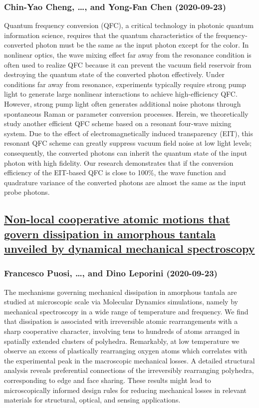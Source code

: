 \subsubsection*{Chin-Yao Cheng, \dots, and Yong-Fan Chen (2020-09-23)}
Quantum frequency conversion (QFC), a critical technology in photonic quantum
information science, requires that the quantum characteristics of the
frequency-converted photon must be the same as the input photon except for the
color. In nonlinear optics, the wave mixing effect far away from the resonance
condition is often used to realize QFC because it can prevent the vacuum field
reservoir from destroying the quantum state of the converted photon
effectively. Under conditions far away from resonance, experiments typically
require strong pump light to generate large nonlinear interactions to achieve
high-efficiency QFC. However, strong pump light often generates additional
noise photons through spontaneous Raman or parameter conversion processes.
Herein, we theoretically study another efficient QFC scheme based on a resonant
four-wave mixing system. Due to the effect of electromagnetically induced
transparency (EIT), this resonant QFC scheme can greatly suppress vacuum field
noise at low light levels; consequently, the converted photons can inherit the
quantum state of the input photon with high fidelity. Our research demonstrates
that if the conversion efficiency of the EIT-based QFC is close to 100\%, the
wave function and quadrature variance of the converted photons are almost the
same as the input probe photons.

\subsection*{\href{http://arxiv.org/abs/2009.11012v1}{Non-local cooperative atomic motions that govern dissipation in  amorphous tantala unveiled by dynamical mechanical spectroscopy}}
\subsubsection*{Francesco Puosi, \dots, and Dino Leporini (2020-09-23)}
The mechanisms governing mechanical dissipation in amorphous tantala are
studied at microscopic scale via Molecular Dynamics simulations, namely by
mechanical spectroscopy in a wide range of temperature and frequency. We find
that dissipation is associated with irreversible atomic rearrangements with a
sharp cooperative character, involving tens to hundreds of atoms arranged in
spatially extended clusters of polyhedra. Remarkably, at low temperature we
observe an excess of plastically rearranging oxygen atoms which correlates with
the experimental peak in the macroscopic mechanical losses. A detailed
structural analysis reveals preferential connections of the irreversibly
rearranging polyhedra, corresponding to edge and face sharing. These results
might lead to microscopically informed design rules for reducing mechanical
losses in relevant materials for structural, optical, and sensing applications.

